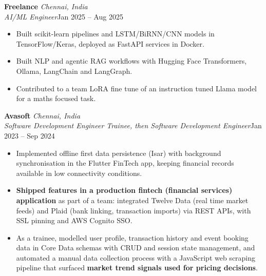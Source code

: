 \documentclass[a4paper,11pt]{article}
\newcommand{\role}[4]{%
  \textbf{#1}{\color{muted}\,\textperiodcentered\,\textit{#2}}\\
  \textit{#4}\hfill{\color{muted}#3}\par}
\newcommand{\gap}{\vspace{5pt}}
\newcommand{\num}[1]{\textbf{#1}}   %
\begin{document}
\gap
{}
\role{Freelance}{Chennai, India}{Jan 2025 – Aug 2025}{AI/ML Engineer}
\begin{itemize}
  \item Built scikit-learn pipelines and LSTM/BiRNN/CNN models in TensorFlow/Keras, deployed as FastAPI services in Docker.
  \item Built NLP and agentic RAG workflows with Hugging Face Transformers, Ollama, LangChain and LangGraph.
  \item Contributed to a team LoRA fine tune of an instruction tuned Llama model for a maths focused task.
\end{itemize}
\gap
{}
\role{Avasoft}{Chennai, India}{Jan 2023 – Sep 2024}{Software Development Engineer Trainee, then Software Development Engineer}
\begin{itemize}
  \item Implemented offline first data persistence (Isar) with background synchronisation in the Flutter FinTech app, keeping financial records available in low connectivity conditions.
  \item \num{Shipped features in a production fintech (financial services) application} as part of a team: integrated Twelve Data (real time market feeds) and Plaid (bank linking, transaction imports) via REST APIs, with SSL pinning and AWS Cognito SSO.
  \item As a trainee, modelled user profile, transaction history and event booking data in Core Data schemas with CRUD and session state management, and automated a manual data collection process with a JavaScript web scraping pipeline that surfaced \num{market trend signals used for pricing decisions}.
\end{itemize}
\end{document}
